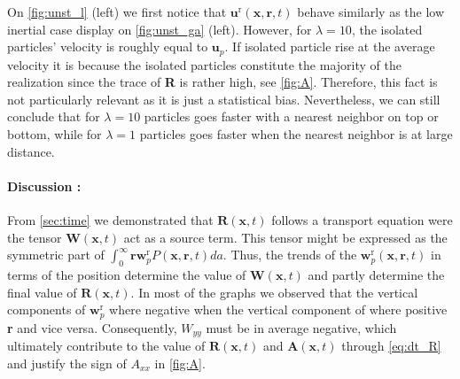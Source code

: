 On \ref{fig:unst_l} (left) we first notice that $\textbf{u}^\text{r}(\textbf{x},\textbf{r},t)$ behave similarly as the low inertial case display on \ref{fig:unst_ga} (left).
However, for $\lambda = 10$, the isolated particles' velocity is roughly equal to $\textbf{u}_p$. 
If isolated particle rise at the average velocity it is because the isolated particles constitute the majority of the realization since the trace of \textbf{R} is rather high, see \ref{fig:A}.
Therefore, this fact is not particularly relevant as it is just a statistical bias. 
Nevertheless, we can still conclude that for $\lambda = 10$ particles goes faster with a nearest neighbor on top or bottom, while for  $\lambda = 1$ particles goes faster when the nearest neighbor is at large distance. 


\paragraph*{Discussion :}
From \ref{sec:time} we demonstrated that $\textbf{R}(\textbf{x},t)$ follows a transport equation were the tensor $\textbf{W}(\textbf{x},t)$ act as a source term. 
This tensor might be expressed as the symmetric part of $\int_0^\infty \textbf{r} \textbf{w}_p^\text{r} P(\textbf{x},\textbf{r},t) da$. 
Thus, the trends of the $\textbf{w}_p^\text{r}(\textbf{x},\textbf{r},t) $ in terms of the position determine the value of $\textbf{W}(\textbf{x},t)$ and partly determine the final value of $\textbf{R}(\textbf{x},t)$. 
In most of the graphs we observed that the vertical components of $\textbf{w}_p^\text{r}$ where negative when the vertical component of where positive \textbf{r} and vice versa. 
Consequently, $W_{yy}$ must be in average negative, which ultimately contribute to the value of $\textbf{R}(\textbf{x},t)$ and $\textbf{A}(\textbf{x},t)$ through \ref{eq:dt_R} and justify the sign of $A_{xx}$ in \ref{fig:A}. 

